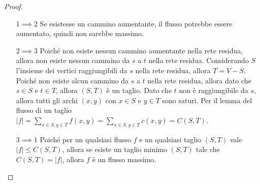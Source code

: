         \begin{proof}
            \begin{enumerate}
                \item[$1\implies 2$] Se esistesse un cammino aumentante, il flusso potrebbe essere aumentato, quindi non sarebbe massimo.
                \item[$2\implies 3$] Poiché non esiste nessun cammino aumentante nella rete residua, allora non esiste nessun cammino da $s$ a $t$ nella rete residua. Considerando $S$ l'insieme dei vertici raggiungibili da $s$ nella rete residua, allora $T=V-S$. Poiché non esiste alcun cammino da $s$ a $t$ nella rete residua, allora dato che $s\in S$ e $t\in T$, allora $(S,T)$ è un taglio. Dato che $t$ non è raggiungibile da $s$, allora tutti gli archi $(x,y)$ con $x\in S$ e $y\in T$ sono saturi. Per il lemma del flusso di un taglio $|f| = \sum_{x\in S,y\in T} f(x,y) = \sum_{x\in S,y\in T} c(x,y) = C(S,T)$.
                \item[$3\implies 1$] Poiché per un qualsiasi flusso $f$ e un qualsiasi taglio $(S,T)$ vale $|f| \leq C(S,T)$, allora se esiste un taglio minimo $(S,T)$ tale che $C(S,T) = |f|$, allora $f$ è un flusso massimo.
            \end{enumerate}
        \end{proof}

